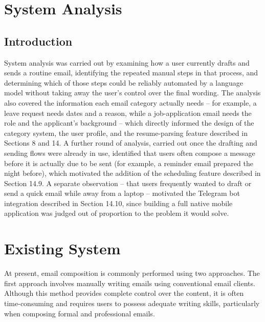 \documentclass[12pt,a4paper]{article}
\begin{document}
\section{System Analysis}

\subsection{Introduction}

System analysis was carried out by examining how a user currently drafts and sends a routine email, identifying the repeated manual steps in that process, and determining which of those steps could be reliably automated by a language model without taking away the user's control over the final wording. The analysis also covered the information each email category actually needs -- for example, a leave request needs dates and a reason, while a job-application email needs the role and the applicant's background -- which directly informed the design of the category system, the user profile, and the resume-parsing feature described in Sections 8 and 14. A further round of analysis, carried out once the drafting and sending flows were already in use, identified that users often compose a message before it is actually due to be sent (for example, a reminder email prepared the night before), which motivated the addition of the scheduling feature described in Section 14.9. A separate observation -- that users frequently wanted to draft or send a quick email while away from a laptop -- motivated the Telegram bot integration described in Section 14.10, since building a full native mobile application was judged out of proportion to the problem it would solve.

\section{Existing System}

At present, email composition is commonly performed using two approaches. The first approach involves manually writing emails using conventional email clients. Although this method provides complete control over the content, it is often time-consuming and requires users to possess adequate writing skills, particularly when composing formal and professional emails.
\end{document}

